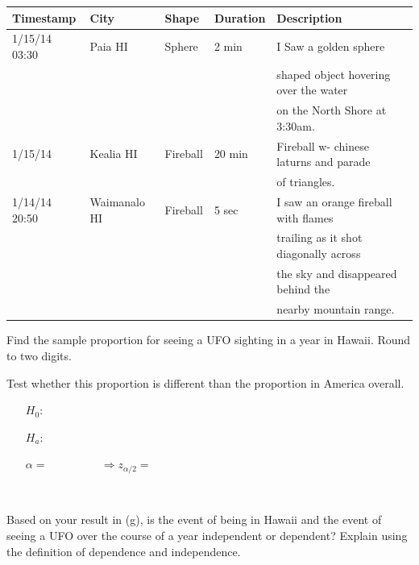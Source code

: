 \documentclass[12pt]{article}
\begin{document}
\begin{table}[htp]
\centering
\footnotesize
\begin{tabular}{lllll}
Timestamp & City & Shape & Duration & Description \\ \hline
1/15/14 03:30&	Paia	HI&	Sphere	&2 min	&  I Saw a golden sphere \\
&&&&shaped object hovering over the water \\
&&&&on the North Shore at 3:30am.	 \\
1/15/14&	Kealia	HI	&Fireball	&20 min&	Fireball w- chinese laturns and parade \\
&&&& of triangles.	 \\
1/14/14 20:50&	Waimanalo	HI	&Fireball&	5 sec&	I saw an orange fireball with flames \\
&&&& trailing as it shot diagonally across \\
&&&& the sky and disappeared behind the\\
&&&& nearby mountain range.	 \\ 
\end{tabular}
\end{table}

Find the sample proportion for seeing a UFO sighting in a year in Hawaii. Round to two digits. 

 Test whether this proportion is different than the proportion in America overall.

\begin{enumerate}
\item [$H_0$:] ~\\
\item [$H_a$:] ~\\
\item [$\alpha =$] ~~~~~~~~ $\Rightarrow z_{\alpha/2} = $
\end{enumerate}~ 

 Based on your result in (g), is the event of being in Hawaii and the event of seeing a UFO over the course of a year independent or dependent? Explain using the definition of dependence and independence. 
\end{document}
